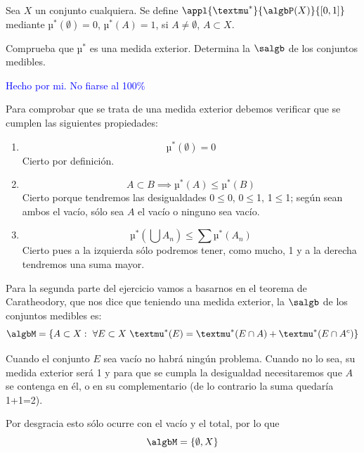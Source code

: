 \begin{problem}[12]
Sea $X$ un conjunto cualquiera. Se define $\appl{µ^*}{\algbP(X)}{[0,1]}$ mediante $µ^*(\emptyset)=0$, $µ^*(A)=1$, si $A \neq \emptyset$, $A\subset X$.

Comprueba que $µ^*$ es una medida exterior. Determina la $\salgb$ de los conjuntos medibles.

\solution
\textcolor{blue}{Hecho por mi. No fiarse al 100\%}

Para comprobar que se trata de una medida exterior debemos verificar que se cumplen las siguientes propiedades:
\begin{enumerate}
\item
\[µ^*(\emptyset)=0\]
Cierto por definición.
\item
\[A \subset B \implies µ^*(A)\leq µ^*(B)\]
Cierto porque tendremos las desigualdades 0$\leq$0, 0$\leq$1, 1$\leq$1; según sean ambos el vacío, sólo sea $A$ el vacío o ninguno sea vacío.
\item
\[µ^*(\bigcup A_n) \leq \sum µ^*(A_n)\]
Cierto pues a la izquierda sólo podremos tener, como mucho, 1 y a la derecha tendremos una suma mayor.
\end{enumerate}

Para la segunda parte del ejercicio vamos a basarnos en el teorema de Caratheodory, que nos dice que teniendo una medida exterior, la $\salgb$ de los conjuntos medibles es:
\[\algbM = \{A \subset X: \ \forall E \subset X \ µ^*(E)=µ^*(E \cap A) + µ^*(E \cap A^c)\}\]

Cuando el conjunto $E$ sea vacío no habrá ningún problema. Cuando no lo sea, su medida exterior será 1 y para que se cumpla la desigualdad necesitaremos que $A$ se contenga en él, o en su complementario (de lo contrario la suma quedaría 1+1=2).

Por desgracia esto sólo ocurre con el vacío y el total, por lo que
\[\algbM = \{\emptyset, X\}\]
\end{problem}

